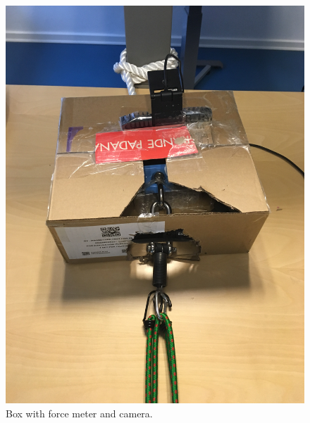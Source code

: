 \begin{figure}
\begin{minipage}[b]{0.4\textwidth}
    \includegraphics[width=\textwidth]{Images/BoxBig.JPG}
    \caption{Box with force meter and camera.}
     \label{fig:setupRopeBox2}
  \end{minipage}
\hspace*{\fill}
\end{figure}

